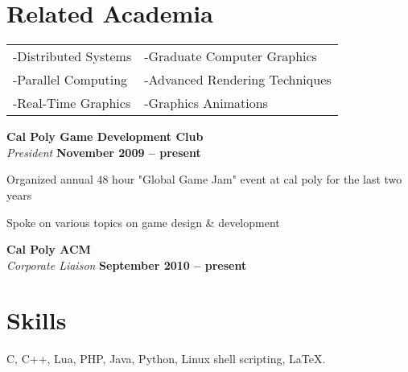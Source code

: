 \documentclass[margin,line]{resume}
\begin{document}
\begin{resume}
    \section{\mysidestyle Related Academia} 

	\vspace{1mm} %
	\begin{tabular}{@{}p{6cm}p{6cm}}
	-Distributed Systems     &  -Graduate Computer Graphics   \\
	-Parallel Computing      &  -Advanced Rendering Techniques    \\
	-Real-Time Graphics      &  -Graphics Animations                   \\
	\end{tabular}

	\textbf{Cal Poly Game Development Club}\\\vspace{1mm}%
	\textsl{President}\hfill \textbf{ November 2009 -- present}\vspace{-3mm}\\\vspace{-1mm}%
    \begin{list2}
    	\item Organized annual 48 hour "Global Game Jam" event at cal poly for the last two years
        \item Spoke on various topics on game design \& development
    \end{list2}\vspace{-1.5mm}

	\textbf{Cal Poly ACM}\\\vspace{1mm}%
	\textsl{Corporate Liaison} \hfill \textbf{ September 2010 -- present}\vspace{-3mm}\\\vspace{-1mm}%


    \section{\mysidestyle Skills}

    C, C++, Lua, PHP, Java, Python, Linux shell scripting, \LaTeX.




\end{resume}
\end{document}
